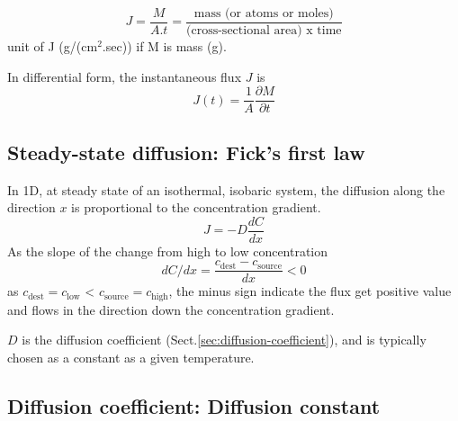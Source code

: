 \begin{equation}
J = \frac{M}{A.t} = \frac{\text{mass (or atoms or
moles)}}{\text{(cross-sectional area) x time}}
\end{equation}
unit of J (g/(cm$^2$.sec)) if M is mass (g).

In differential form, the instantaneous flux $J$ is
\begin{equation}
J(t) = \frac{1}{A} \frac{\partial M}{\partial t}
\end{equation}

\subsection{Steady-state diffusion: Fick's first law}

In 1D, at steady state of an isothermal, isobaric system, the diffusion along
the direction $x$ is proportional to the concentration gradient.
\begin{equation}
J = - D \frac{dC}{dx}
\end{equation}
As the slope of the change from high to low concentration 
\begin{equation*}
dC/dx = \frac{c_\text{dest}-c_\text{source}}{dx} < 0
\end{equation*}
as $c_\text{dest}=c_\text{low}$ < $c_\text{source}=c_\text{high}$, the minus sign indicate the flux
get positive value and flows in the direction down the concentration gradient. 

$D$ is the diffusion coefficient (Sect.\ref{sec:diffusion-coefficient}), and is
typically chosen as a constant as a given temperature.

\subsection{Diffusion coefficient: Diffusion constant}
\label{sec:diffusion-constant}
\label{sec:diffusion-coefficient}

